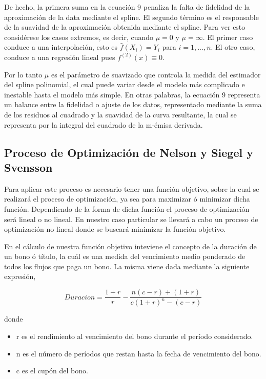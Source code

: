 \documentclass[
  12pt,
]{krantz}
\providecommand{\tightlist}{%
  \setlength{\itemsep}{0pt}\setlength{\parskip}{0pt}}
\begin{document}
De hecho, la primera suma en la ecuación 9 penaliza la falta de fidelidad de la aproximación de la data mediante el spline. El segundo término es el responsable de la suavidad de la aproximación obtenida mediante el spline. Para ver esto considérese los casos extremos, es decir, cuando \(\mu =0\) y \(\mu=\infty\). El primer caso conduce a una interpolación, esto es \(\hat{f}(X_{i})=Y_{i}\) para \(i=1,...,n\). El otro caso, conduce a una regresión lineal pues \(f^{(2)}(x)\equiv 0\).

Por lo tanto \(\mu\) es el parámetro de suavizado que controla la medida del estimador del spline polinomial, el cual puede variar desde el modelo más complicado e inestable hasta el modelo más simple. En otras palabras, la ecuación 9 representa un balance entre la fidelidad o ajuste de los datos, representado mediante la suma de los residuos al cuadrado y la suavidad de la curva resultante, la cual se representa por la integral del cuadrado de la m-émisa derivada.

\hypertarget{proceso-de-optimizacion-de-nelson-y-siegel-y-svensson}{%
\subsection{Proceso de Optimización de Nelson y Siegel y Svensson}\label{proceso-de-optimizacion-de-nelson-y-siegel-y-svensson}}

Para aplicar este proceso es necesario tener una función objetivo, sobre la cual se realizará el proceso de optimización, ya sea para maximizar ó minimizar dicha función. Dependiendo de la forma de dicha función el proceso de optimización será lineal o no lineal. En nuestro caso particular se llevará a cabo un proceso de optimización no lineal donde se buscará minimizar la función objetivo.

En el cálculo de nuestra función objetivo inteviene el concepto de la duración de un bono ó título, la cuál es una medida del vencimiento medio ponderado de todos los flujos que paga un bono. La misma viene dada mediante la siguiente expresión,

\[\displaystyle{Duracion = \frac{1+r}{r} - \frac{n(c-r)+(1+r)}{c(1+r)^{n}-(c-r)}}\]

donde

\begin{itemize}
\tightlist
\item
  r es el rendimiento al vencimiento del bono durante el período considerado.
\item
  n es el número de períodos que restan hasta la fecha de vencimiento del bono.
\item
  c es el cupón del bono.
\end{itemize}
\end{document}
